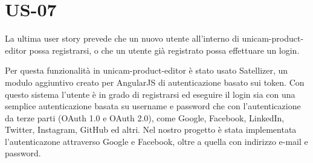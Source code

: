 \section{US-07}
La ultima user story prevede che un nuovo utente all'interno di unicam-product-editor possa registrarsi, o che un utente già registrato possa effettuare un login.

Per questa funzionalità in unicam-product-editor è stato usato Satellizer\cite{Satellizer}, un modulo aggiuntivo creato per AngularJS di autenticazione basato sui token. Con questo sistema l'utente è in grado di registrarsi ed eseguire il login sia con una semplice autenticazione basata su username e password che con l'autenticazione da terze parti (OAuth 1.0 e OAuth 2.0), come Google, Facebook, LinkedIn, Twitter, Instagram, GitHub ed altri. Nel nostro progetto è stata implementata l'autenticazone attraverso Google e Facebook, oltre a quella con indirizzo e-mail e password.

